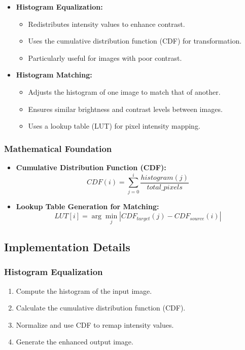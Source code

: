 \documentclass[12pt,a4paper]{article}
\begin{document}
\begin{itemize}
  \item \textbf{Histogram Equalization:}
    \begin{itemize}
      \item Redistributes intensity values to enhance contrast.
      \item Uses the cumulative distribution function (CDF) for transformation.
      \item Particularly useful for images with poor contrast.
    \end{itemize}

  \item \textbf{Histogram Matching:}
    \begin{itemize}
      \item Adjusts the histogram of one image to match that of another.
      \item Ensures similar brightness and contrast levels between images.
      \item Uses a lookup table (LUT) for pixel intensity mapping.
    \end{itemize}
\end{itemize}

\subsubsection{Mathematical Foundation}
\begin{itemize}
  \item \textbf{Cumulative Distribution Function (CDF):}
    \[
      CDF(i) = \sum_{j=0}^{i} \frac{histogram(j)}{total\_pixels}
    \]
  \item \textbf{Lookup Table Generation for Matching:}
    \[
      LUT[i] = \arg\min_j |CDF_{target}(j) - CDF_{source}(i)|
    \]
\end{itemize}

\subsection{Implementation Details}
\subsubsection{Histogram Equalization}
\begin{enumerate}
  \item Compute the histogram of the input image.
  \item Calculate the cumulative distribution function (CDF).
  \item Normalize and use CDF to remap intensity values.
  \item Generate the enhanced output image.
\end{enumerate}
\end{document}
